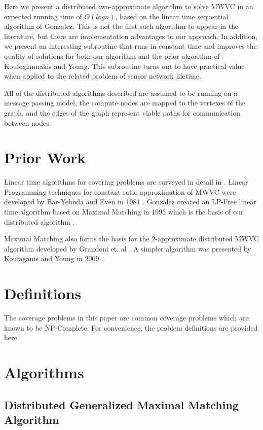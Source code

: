 Here we present a distributed two-approximate algorithm to solve MWVC in an expected running time of $O(logn)$, based on the linear time sequential algorithm of Gonzalez.\cite{Gonzalez1995129} This is not the first such algorithm to appear in the literature, but there are implementation advantages to our approach. In addition, we present an interesting subroutine that runs in constant time and improves the quality of solutions for both our algorithm and the prior algorithm of Koufogiannakis and Young.\cite{1582746} This subroutine turns out to have practical value when applied to the related problem of sensor network lifetime. 

All of the distributed algorithms described are assumed to be running on a message passing model, the compute nodes are mapped to the vertexes of the graph, and the edges of the graph represent viable paths for communication between nodes. 

\section{Prior Work}

Linear time algorithms for covering problems are surveyed in detail in \cite{254190}. Linear Programming techniques for constant ratio approximation of MWVC were developed by Bar-Yehuda and Even in 1981 \cite{Bar-Yehuda:1981lr,:fk}. Gonzalez created an LP-Free linear time algorithm based on Maximal Matching in 1995 which is the basis of our distributed algorithm \cite{Gonzalez1995129}. 

Maximal Matching also forms the basis for the 2-approximate distributed MWVC algorithm developed by Grandoni et. al \cite{1435381}. A simpler algorithm was presented by Koufaganis and Young in 2009 \cite{1582746}. 

\section{Definitions}
The coverage problems in this paper are common coverage problems which are known to be NP-Complete. For convenience, the problem definitions are provided here.



\section{Algorithms}
\label{sec:algorithms}

\subsection{Distributed Generalized Maximal Matching Algorithm}
